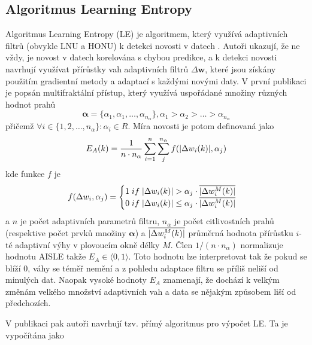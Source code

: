 \subsection{Algoritmus Learning Entropy}\label{chap:LE}
Algoritmus Learning Entropy (LE) je algoritmem, který využívá adaptivních filtrů (obvykle LNU a HONU) k detekci novosti v datech \cite{ivoLE1,ivoLE2}. Autoři ukazují, že ne vždy, je novost v datech korelována s chybou predikce, a k detekci novosti navrhují využívat přírůstky vah adaptivních filtrů $\Delta\textbf{w}$, které jsou získány použitím gradientní metody a adaptací s každými novými daty. V první publikaci \cite{ivoLE1} je popsán multifraktální přístup, který využívá uspořádané množiny různých hodnot prahů
\begin{equation}
\boldsymbol{\alpha}=\{ \alpha_1,\alpha_1,\dots,\alpha_{n_{\alpha}} \}, \alpha_1>\alpha_2>\dots>\alpha_{n_{\alpha}}
\end{equation}
přičemž $\forall i \in \{1,2,\dots,n_{\alpha} \}:\alpha_i\in R$. Míra novosti  je potom definovaná jako
\begin{equation}\label{eq:aisle}
E_A(k)=\frac{1}{n\cdot n_{\alpha}}\sum_{i=1}^{n}\sum_j^{n_{\alpha}} f(\lvert\Delta w_i(k)\rvert, \alpha_j)
\end{equation}
kde funkce $f$ je
\begin{equation}
f(\Delta w_i, \alpha_j)=\begin{cases}
1 \; if \; \lvert\Delta w_i(k)\rvert>\alpha_{j} \cdot \overline{\lvert\Delta w_i^M(k)\rvert}\\
0 \; if \; \lvert\Delta w_i(k)\rvert\leq \alpha_j \cdot \overline{\lvert\Delta w_i^M(k)\rvert}


\end{cases}
\end{equation}
a $n$ je počet adaptivních parametrů filtru, $n_{\alpha}$ je počet citlivostních prahů (respektive počet prvků množiny $\boldsymbol{\alpha}$) a $\overline{\lvert\Delta w_i^M(k)\rvert}$ průměrná hodnota přírůstku $i$-té adaptivní výhy v plovoucím okně délky $M$. Člen $1/(n\cdot n_{\alpha})$ normalizuje hodnotu AISLE takže  $E_A \in \langle 0,1\rangle$. Toto hodnotu lze interpretovat tak že pokud se blíží 0, váhy se téměř nemění a z pohledu adaptace filtru se příliš neliší od minulých dat. Naopak vysoké hodnoty $E_A$ znamenají, že dochází k velkým změnám velkého množství adaptivních vah a data se nějakým způsobem liší od předchozích. 
\par
V publikaci \cite{ivoLE2} pak autoři navrhují tzv. přímý algoritmus pro výpočet LE. Ta je vypočítána jako
